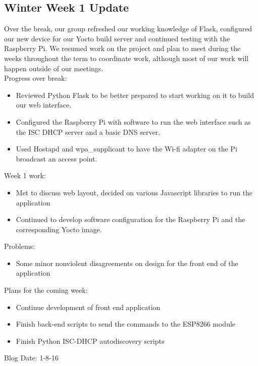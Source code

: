 \subsection{Winter Week 1 Update}
Over the break, our group refreshed our working knowledge of Flask, configured our new device for our Yocto build server and continued testing with the Raspberry Pi. We resumed work on the project and plan to meet during the weeks throughout the term to coordinate work, although most of our work will happen outside of our meetings. \\
Progress over break:
\begin{itemize}
   \item Reviewed Python Flask to be better prepared to start working on it to build our web interface.
   \item Configured the Raspberry Pi with software to run the web interface such as the ISC DHCP server and a basic DNS server.
   \item Used Hostapd and wpa\_supplicant to have the Wi-fi adapter on the Pi broadcast an access point.
\end{itemize}
Week 1 work:
\begin{itemize}
   \item Met to discuss web layout, decided on various Javascript libraries to run the application
   \item Continued to develop software configuration for the Raspberry Pi and the corresponding Yocto image.
\end{itemize}
Problems:
\begin{itemize}
   \item Some minor nonviolent disagreements on design for the front end of the application
\end{itemize}
Plans for the coming week:
\begin{itemize}
   \item Continue development of front end application
   \item Finish back-end scripts to send the commands to the ESP8266 module
   \item Finish Python ISC-DHCP autodiscovery scripts
\end{itemize}
Blog Date: 1-8-16

